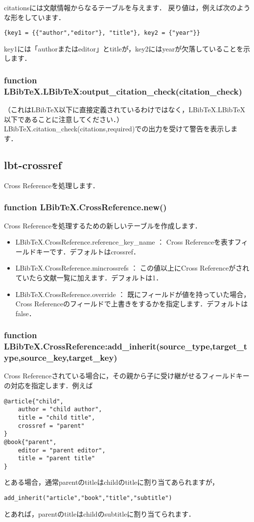 \documentclass[dvipdfmx,a4paper]{jsarticle}
\begin{document}
citationsには文献情報からなるテーブルを与えます．
戻り値は，例えば次のような形をしています．
\begin{lstlisting}
{key1 = {{"author","editor"}, "title"}, key2 = {"year"}}
\end{lstlisting}
key1には「authorまたはeditor」とtitleが，key2にはyearが欠落していることを示します．

\subsubsection{function LBibTeX.LBibTeX:output\_citation\_check(citation\_check)}
（これはLBibTeX以下に直接定義されているわけではなく，LBibTeX.LBibTeX以下であることに注意してください．）
LBibTeX.citation\_check(citations,required)での出力を受けて警告を表示します．

\subsection{lbt-crossref}
Cross Referenceを処理します．

\subsubsection{function LBibTeX.CrossReference.new()}
Cross Referenceを処理するための新しいテーブルを作成します．
\begin{itemize}
\item LBibTeX.CrossReference.reference\_key\_name ： Cross Referenceを表すフィールドキーです．デフォルトはcrossref．
\item LBibTeX.CrossReference.mincrossrefs ： この値以上にCross Referenceがされていたら文献一覧に加えます．デフォルトは1．
\item LBibTeX.CrossReference.override ： 既にフィールドが値を持っていた場合，Cross Referenceのフィールドで上書きをするかを指定します．デフォルトはfalse．
\end{itemize}

\subsubsection{function LBibTeX.CrossReference:add\_inherit(source\_type,target\_type,source\_key,target\_key)}
Cross Referenceされている場合に，その親から子に受け継がせるフィールドキーの対応を指定します．例えば
\begin{verbatim}
@article{"child",
    author = "child author",
    title = "child title",
    crossref = "parent"
}
@book{"parent",
    editor = "parent editor",
    title = "parent title"
}
\end{verbatim}
とある場合，通常parentのtitleはchildのtitleに割り当てあられますが，
\begin{lstlisting}
add_inherit("article","book","title","subtitle")
\end{lstlisting}
とあれば，parentのtitleはchildのsubtitleに割り当てられます．
\end{document}
